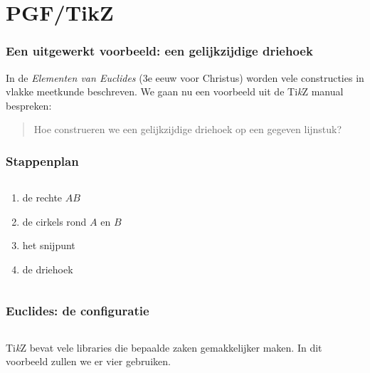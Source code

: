 \documentclass[]{beamer}
\newcommand\TikZ{Ti\textit{k}Z\xspace}
\begin{document}
\section{PGF/TikZ}

\begin{frame}
  \frametitle{Een uitgewerkt voorbeeld: een gelijkzijdige driehoek}

  In de \emph{Elementen van Euclides} (3e eeuw voor Christus) worden vele constructies in vlakke meetkunde beschreven. We gaan nu een voorbeeld uit de Ti\textit{k}Z manual bespreken:
  \begin{quote}
    Hoe construeren we een gelijkzijdige driehoek op een gegeven lijnstuk?
  \end{quote}

  \pause
  \centering
  
\end{frame}

\begin{frame}
  \frametitle{Stappenplan}

  \begin{columns}
    \begin{column}{.5\textwidth}
      \begin{enumerate}
        \item de rechte $AB$
        \item de cirkels rond $A$ en $B$
        \item het snijpunt
        \item de driehoek
      \end{enumerate}
    \end{column}
    \begin{column}{.5\textwidth}
      \centering
      
    \end{column}
  \end{columns}
\end{frame}

\begin{frame}
  \frametitle{Euclides: de configuratie}
  
  \inputminted[fontsize = \scriptsize]{latex}{tikz/triangle/configuration.tikz}

  \TikZ bevat vele libraries die bepaalde zaken gemakkelijker maken. In dit voorbeeld zullen we er vier gebruiken.
\end{frame}
\end{document}
